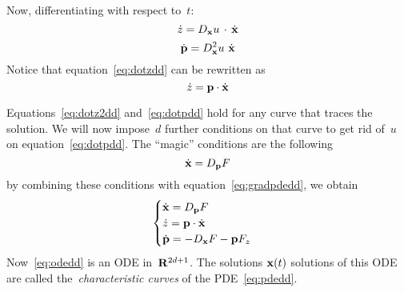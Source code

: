 Now, differentiating with respect to~$t$:
\begin{equation}\label{eq:dotzdd}
	\dot z=D_{\mathbf{x}}u\,\cdot\,\dot{\mathbf{x}}
\end{equation}
\begin{equation}\label{eq:dotpdd}
	\dot{\mathbf{p}}=D^2_{\mathbf{x}}u\  \dot{\mathbf{x}}
\end{equation}
Notice that equation~\ref{eq:dotzdd} can be rewritten as
\begin{equation}\label{eq:dotz2dd}\dot z=\mathbf{p}\cdot\dot{\mathbf{x}}\end{equation}

Equations~\ref{eq:dotz2dd} and~\ref{eq:dotpdd} hold for any
curve that traces the solution.  We will now impose~$d$ further
conditions on that curve to get rid of~$u$ on equation~\ref{eq:dotpdd}.
The ``magic'' conditions are the following
\begin{equation}
	\dot{\mathbf{x}} = D_{\mathbf{p}}F
\end{equation}
by combining these conditions with equation~\ref{eq:gradpdedd}, we obtain
\begin{equation}\label{eq:odedd}
	\begin{cases}
		\dot{\mathbf{x}} = D_{\mathbf{p}}F \\
		\dot z = \mathbf{p}\cdot\dot{\mathbf{x}} \\
		\dot{\mathbf{p}} = -D_{\mathbf{x}}F - \mathbf{p} F_z \\
	\end{cases}
\end{equation}
Now~\ref{eq:odedd} is an ODE in~$\mathbf{R}^{2d+1}$.
The solutions $\mathbf{x}(t)$ solutions
of this ODE are called the~\emph{characteristic curves} of the
PDE~\ref{eq:pdedd}.


